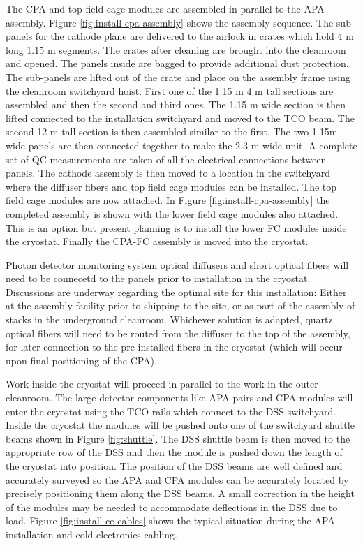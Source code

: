 The CPA and top field-cage modules are assembled in parallel to the APA assembly. Figure \ref{fig:install-cpa-assembly} shows the  assembly sequence. The sub-panels for the cathode plane are delivered to the airlock in crates which hold 4 \si{m} long 1.15 \si{m} segments. The crates after cleaning are brought into the cleanroom and opened. The panels inside are bagged to provide additional dust protection. The sub-panels are lifted out of the crate and place on the assembly frame using the cleanroom switchyard hoist. First one of the 1.15 \si{m} 4 
\si{m} tall sections are assembled and then the second and third ones. The 1.15 \si{m} wide section is then lifted connected to the installation switchyard and moved to the TCO beam. The second 12 \si{m} tall section is then assembled similar to the first. The two 1.15m wide panels are then connected together to make the 2.3 \si{m} wide unit.  A complete set of QC measurements are taken of all the electrical connections between panels.  The cathode assembly  is then moved to a location in the switchyard where the diffuser fibers and top field cage modules can be installed.
 The top field cage modules are now attached. In Figure \ref{fig:install-cpa-assembly} the completed assembly is shown with the lower field cage modules also attached. This is an option but present planning is to install the lower FC modules  inside the cryostat. Finally the CPA-FC assembly is moved into the cryostat.


Photon detector monitoring system optical diffusers and short optical fibers will need to be connecetd to the  panels prior to installation in the cryostat.  Discussions are underway regarding the optimal site for this installation:  Either at the  assembly facility prior to shipping to the site, or as part of the assembly of  stacks in the underground cleanroom.  Whichever solution is adapted, quartz optical fibers will need to be routed from the diffuser to the top of the  assembly, for later connection to the pre-installed fibers in the cryostat (which will occur upon final positioning of the CPA).  

Work inside the cryostat will proceed in parallel to the work in the outer cleanroom. 
The large detector components like APA pairs and CPA modules will enter the cryostat using the TCO rails which connect to the DSS switchyard.
Inside the cryostat the modules will be pushed onto one of the switchyard shuttle beams shown in  Figure \ref{fig:shuttle}. 
The DSS shuttle beam is then moved to the appropriate row of the DSS and then the module is pushed down the length of the cryostat into position. The position of the DSS beams are well defined and accurately surveyed so the APA and CPA modules can be accurately located by precisely positioning them along the DSS beams. A small correction in the height of the modules may be needed to accommodate deflections in the DSS due to load. Figure \ref{fig:install-ce-cables} shows the typical situation during the APA installation and cold electronics cabling. 

